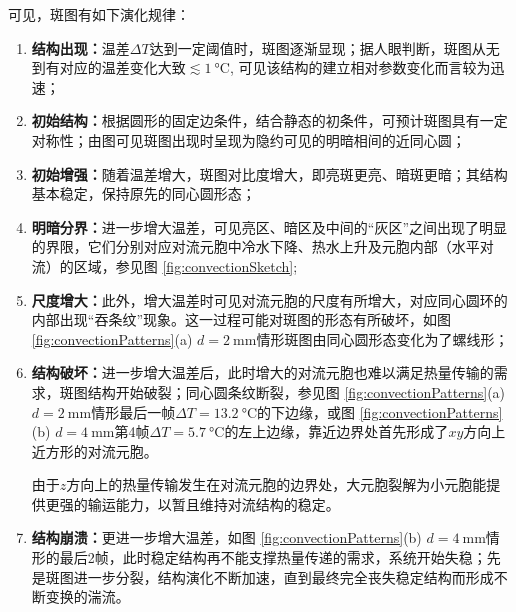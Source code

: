 \documentclass[aps,pre,12pt,preprint,%
	onecolumn,showpacs,showkeys,nofootinbib]{revtex4-1}
\begin{document}
	可见，斑图有如下演化规律：
	\begin{enumerate}[listparindent=\parindent]
	\item \textbf{结构出现：}温差$\Delta T$达到一定阈值时，斑图逐渐显现；据人眼判断，斑图从无到有对应的温差变化大致$\lesssim\SI{1}{\celsius}$, 可见该结构的建立相对参数变化而言较为迅速；
	\item \textbf{初始结构：}根据圆形的固定边条件，结合静态的初条件，可预计斑图具有一定对称性；由图可见斑图出现时呈现为隐约可见的明暗相间的近同心圆；
	\item \textbf{初始增强：}随着温差增大，斑图对比度增大，即亮斑更亮、暗斑更暗；其结构基本稳定，保持原先的同心圆形态；
	\item \textbf{明暗分界：}进一步增大温差，可见亮区、暗区及中间的“灰区”之间出现了明显的界限，它们分别对应对流元胞中冷水下降、热水上升及元胞内部（水平对流）的区域，参见图 \ref{fig:convectionSketch}; 
	\item \textbf{尺度增大：}此外，增大温差时可见对流元胞的尺度有所增大，对应同心圆环的内部出现“吞条纹”现象。这一过程可能对斑图的形态有所破坏，如图 \ref{fig:convectionPatterns}(a) $d = \SI{2}{\mm}$情形斑图由同心圆形态变化为了螺线形；
	\item \textbf{结构破坏：}进一步增大温差后，此时增大的对流元胞也难以满足热量传输的需求，斑图结构开始破裂；同心圆条纹断裂，参见图 \ref{fig:convectionPatterns}(a) $d = \SI{2}{\mm}$情形最后一帧$\Delta T = \SI{13.2}{\celsius}$的下边缘，或图 \ref{fig:convectionPatterns}(b) $d = \SI{4}{\mm}$第4帧$\Delta T = \SI{5.7}{\celsius}$的左上边缘，靠近边界处首先形成了$xy$方向上近方形的对流元胞。
	
	由于$z$方向上的热量传输发生在对流元胞的边界处，大元胞裂解为小元胞能提供更强的输运能力，以暂且维持对流结构的稳定。
	\item \textbf{结构崩溃：}更进一步增大温差，如图 \ref{fig:convectionPatterns}(b) $d = \SI{4}{\mm}$情形的最后2帧，此时稳定结构再不能支撑热量传递的需求，系统开始失稳；先是斑图进一步分裂，结构演化不断加速，直到最终完全丧失稳定结构而形成不断变换的湍流。
	\end{enumerate}
	
\end{document}
